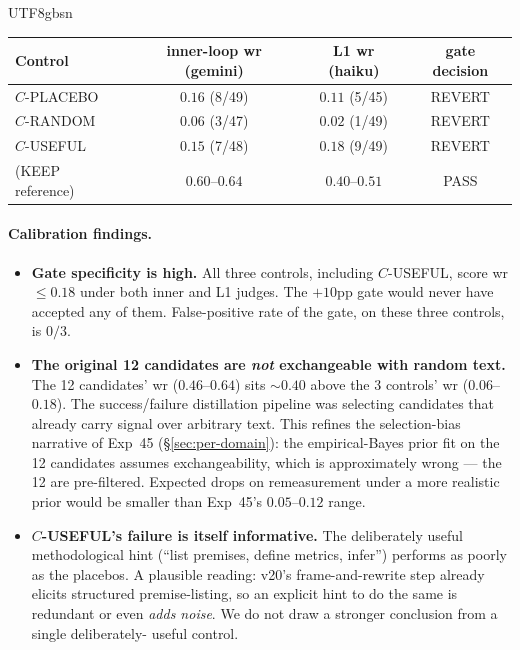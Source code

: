 \documentclass{article}
\begin{document}
\begin{CJK*}{UTF8}{gbsn}
\begin{center}\small
\begin{tabular}{l c c c}
  \toprule
  Control & inner-loop wr (gemini) & L1 wr (haiku) & gate decision \\
  \midrule
  \(C\)-PLACEBO     & \(0.16\) (8/49)  & \(0.11\) (5/45)  & REVERT \\
  \(C\)-RANDOM      & \(0.06\) (3/47)  & \(0.02\) (1/49)  & REVERT \\
  \(C\)-USEFUL      & \(0.15\) (7/48)  & \(0.18\) (9/49)  & REVERT \\
  \midrule
  (KEEP reference)  & \(0.60\)--\(0.64\) & \(0.40\)--\(0.51\) & PASS \\
  \bottomrule
\end{tabular}
\end{center}

\paragraph{Calibration findings.}
\begin{itemize}[leftmargin=*,topsep=2pt,itemsep=2pt]
  \item \textbf{Gate specificity is high.} All three controls,
    including \(C\)-USEFUL, score wr \(\leq 0.18\) under both
    inner and L1 judges. The \(+10\)pp gate would never have
    accepted any of them. False-positive rate of the gate, on
    these three controls, is \(0/3\).
  \item \textbf{The original 12 candidates are \emph{not}
    exchangeable with random text.} The 12 candidates' wr
    (\(0.46\)--\(0.64\)) sits \({\sim}0.40\) above the 3
    controls' wr (\(0.06\)--\(0.18\)). The success/failure
    distillation pipeline was selecting candidates that already
    carry signal over arbitrary text. This refines the
    selection-bias narrative of Exp~45 (\S\ref{sec:per-domain}):
    the empirical-Bayes prior fit on the 12 candidates assumes
    exchangeability, which is approximately wrong --- the 12 are
    pre-filtered. Expected drops on remeasurement under a more
    realistic prior would be smaller than Exp~45's
    \(0.05\)--\(0.12\) range.
  \item \textbf{\(C\)-USEFUL's failure is itself informative.} The
    deliberately useful methodological hint (``list premises,
    define metrics, infer'') performs as poorly as the placebos.
    A plausible reading: v20's frame-and-rewrite step already
    elicits structured premise-listing, so an explicit hint to
    do the same is redundant or even \emph{adds noise}. We do
    not draw a stronger conclusion from a single deliberately-
    useful control.
\end{itemize}


\end{CJK*}
\end{document}

